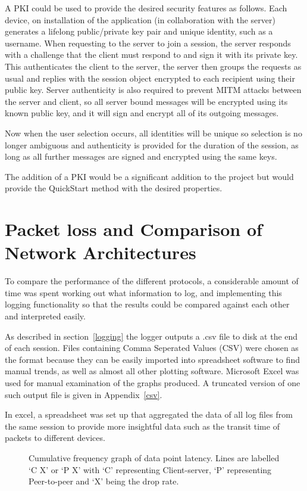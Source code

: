 A PKI could be used to provide the desired security features as follows. Each device, on installation of the application (in collaboration with the server) generates a lifelong public/private key pair and unique identity, such as a username. When requesting to the server to join a session, the server responds with a challenge that the client must respond to and sign it with its private key. This authenticates the client to the server, the server then groups the requests as usual and replies with the session object encrypted to each recipient using their public key. Server authenticity is also required to prevent MITM attacks between the server and client, so all server bound messages will be encrypted using its known public key, and it will sign and encrypt all of its outgoing messages.

Now when the user selection occurs, all identities will be unique so selection is no longer ambiguous and authenticity is provided for the duration of the session, as long as all further messages are signed and encrypted using the same keys.

The addition of a PKI would be a significant addition to the project but would provide the QuickStart method with the desired properties.

\section{Packet loss and Comparison of Network Architectures}

To compare the performance of the different protocols, a considerable amount of time was spent working out what information to log, and implementing this logging functionality so that the results could be compared against each other and interpreted easily.

As described in section~\ref{logging} the logger outputs a .csv file to disk at the end of each session. Files containing Comma Seperated Values (CSV) were chosen as the format because they can be easily imported into spreadsheet software to find manual trends, as well as almost all other plotting software. Microsoft Excel was used for manual examination of the graphs produced.
A truncated version of one such output file is given in Appendix~\ref{csv}.

In excel, a spreadsheet was set up that aggregated the data of all log files from the same session to provide more insightful data such as the transit time of packets to different devices.

\begin{figure}[H]
\centering

\caption{Cumulative frequency graph of data point latency. Lines are labelled `C X' or `P X' with `C' representing Client-server, `P' representing Peer-to-peer and `X' being the drop rate.}
\label{packetloss}
\end{figure}

